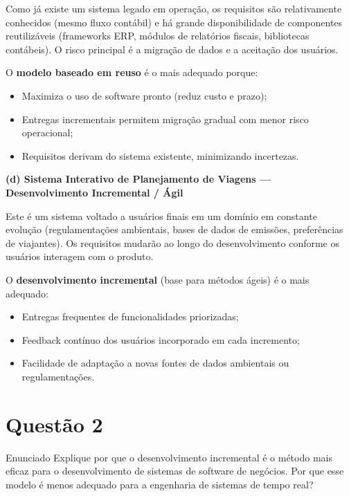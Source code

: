 \documentclass[12pt,a4paper]{article}
\begin{document}
\begin{resposta}
Como já existe um sistema legado em operação, os requisitos são relativamente
conhecidos (mesmo fluxo contábil) e há grande disponibilidade de componentes
reutilizáveis (frameworks ERP, módulos de relatórios fiscais, bibliotecas
contábeis). O risco principal é a migração de dados e a aceitação dos usuários.

O \textbf{modelo baseado em reuso} é o mais adequado porque:
\begin{itemize}[nosep]
  \item Maximiza o uso de software pronto (reduz custo e prazo);
  \item Entregas incrementais permitem migração gradual com menor risco operacional;
  \item Requisitos derivam do sistema existente, minimizando incertezas.
\end{itemize}

\vspace{8pt}
\textbf{(d) Sistema Interativo de Planejamento de Viagens — Desenvolvimento Incremental / Ágil}

Este é um sistema voltado a usuários finais em um domínio em constante evolução
(regulamentações ambientais, bases de dados de emissões, preferências de viajantes).
Os requisitos mudarão ao longo do desenvolvimento conforme os usuários interagem
com o produto.

O \textbf{desenvolvimento incremental} (base para métodos ágeis) é o mais adequado:
\begin{itemize}[nosep]
  \item Entregas frequentes de funcionalidades priorizadas;
  \item Feedback contínuo dos usuários incorporado em cada incremento;
  \item Facilidade de adaptação a novas fontes de dados ambientais ou regulamentações.
\end{itemize}

\end{resposta}

\section*{Questão 2}

\begin{questao}{Enunciado}
Explique por que o desenvolvimento incremental é o método mais eficaz para
o desenvolvimento de sistemas de software de negócios. Por que esse modelo
é menos adequado para a engenharia de sistemas de tempo real?
\end{questao}
\end{document}
